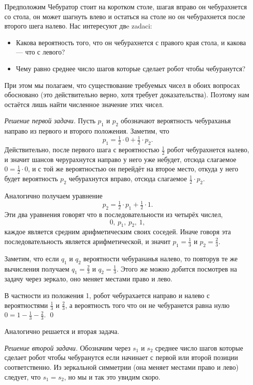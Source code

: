 \documentclass{article}
\begin{document}
Предположим Чебуратор стоит на коротком столе,
шагая вправо он чебурахнется со стола,
он может шагнуть влево и остаться на столе но он чебурахнется после второго шега налево.
Нас интересуют двe zadaci:
\begin{itemize}
\item Какова вероятность того, что он чебурахнется с правого края стола, и какова --- что с левого?
\item Чему равно среднее число шагов которые сделает робот чтобы чебуранутся?
\end{itemize}
При этом мы полагаем, что существование требуемых чисел в обоих вопросах обосновано
(это действительно верно, хотя требует доказательства).
Поэтому нам остаётся лишь найти
численное значение этих чисел. 

\medskip
\noindent\textit{Решение первой задачи.}
Пусть $p_1$ и $p_2$ обозначают вероятность чебураханья направо из первого и второго положения. 
Заметим, что
\[p_1=\tfrac12\cdot0+\tfrac12\cdot p_2.\]
Действительно, после первого шага 
с вероятностью $\tfrac12$ робот чебурахнется налево,
и значит шансов черурахнутся направо у него уже небудет, 
отсюда слагаемое $0=\tfrac12\cdot0$,
и с той же вероятностью он перейдёт на второе место,
откуда у него будет вероятность $p_2$ чебурахнутся вправо,
отсюда слагаемое $\tfrac12\cdot p_2$.

Аналогично получаем уравнение 
\[p_2=\tfrac12\cdot p_1+\tfrac12\cdot 1.\]
Эти два уравнения говорят что в последовательности из четырёх числел, 
\[0,\  p_1,\  p_2,\ 1,\]
каждое является средним арифметическим своих соседей.
Иначе говоря эта последовательность является арифметической, 
и значит $p_1=\tfrac13$ и $p_2=\tfrac23$.

Заметим, что если $q_1$ и $q_2$ вероятности чебурананья налево, 
то повторув те же вычисления получаем $q_1=\tfrac23$ и $q_2=\tfrac13$.
Этого же можно добится посмотрев на задачу через зеркало, оно меняет местами право и лево.

В частности из положения 1, робот чебурахается направо и налево с вероятностями $\tfrac13$ и $\tfrac23$, 
а вероятность того что он не чебуранется равна нулю $0=1-\tfrac13-\tfrac23$.
\qed
\medskip

Аналогично решается и вторая задача.

\medskip
\noindent\textit{Решение второй задачи.}
Обозначим через $s_1$ и $s_2$ среднее число шагов которые сделает робот чтобы чебуранутся
если начинает с первой или второй позиции соответственно.
Из зеркальной симметрии (она меняет местами право и лево) следует, что $s_1=s_2$,
но мы и так это увидим скоро.
\end{document}
